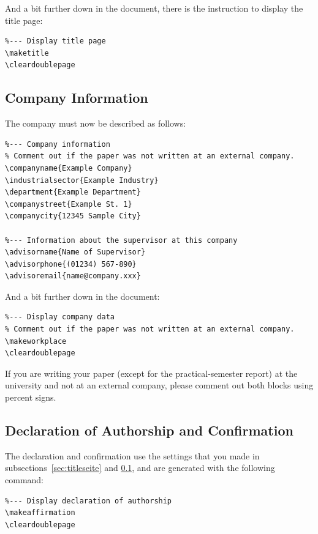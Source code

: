 \documentclass[pdftex,a4paper]{scrartcl}
\begin{document}
And a bit further down in the document, there is the instruction to display the title page:

\begin{verbatim}
%--- Display title page
\maketitle
\cleardoublepage
\end{verbatim}

\subsection{Company Information}
\label{sec:praxisstelle}
The company must now be described as follows:

\begin{verbatim}
%--- Company information
% Comment out if the paper was not written at an external company.
\companyname{Example Company}
\industrialsector{Example Industry}
\department{Example Department}
\companystreet{Example St. 1}
\companycity{12345 Sample City}

%--- Information about the supervisor at this company
\advisorname{Name of Supervisor}
\advisorphone{(01234) 567-890}
\advisoremail{name@company.xxx}
\end{verbatim}

And a bit further down in the document:

\begin{verbatim}
%--- Display company data
% Comment out if the paper was not written at an external company.
\makeworkplace
\cleardoublepage
\end{verbatim}

\begin{noteblock}
If you are writing your paper (except for the practical-semester report) at the
 university and not at an external company, please comment out both blocks
 using percent signs.
\end{noteblock}

\subsection{Declaration of Authorship and Confirmation}

The declaration and confirmation use the settings
that you made in subsections~\ref{sec:titleseite} and \ref{sec:praxisstelle},
and are generated with the following command:

\begin{verbatim}
%--- Display declaration of authorship
\makeaffirmation
\cleardoublepage
\end{verbatim}
\end{document}

